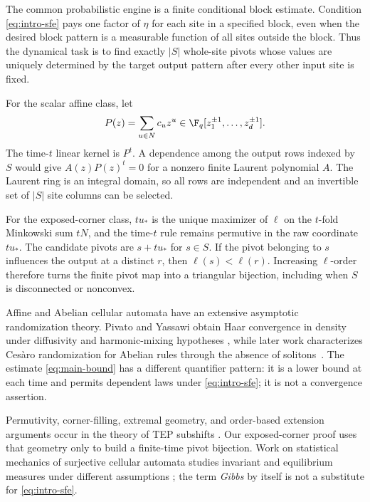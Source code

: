 The common probabilistic engine is a finite conditional block estimate.
Condition \eqref{eq:intro-sfe} pays one factor of $\eta$ for each site in a
specified block, even when the desired block pattern is a measurable
function of all sites outside the block.  Thus the dynamical task is to find
exactly $|S|$ whole-site pivots whose values are uniquely determined by the
target output pattern after every other input site is fixed.

For the scalar affine class, let
\[
  P(z)=\sum_{u\in N}c_u z^u
  \in\F_q[z_1^{\pm1},\ldots,z_d^{\pm1}].
\]
The time-$t$ linear kernel is $P^t$.  A dependence among the output rows
indexed by $S$ would give $A(z)P(z)^t=0$ for a nonzero finite Laurent
polynomial $A$.  The Laurent ring is an integral domain, so all rows are
independent and an invertible set of $|S|$ site columns can be selected.

For the exposed-corner class, $tu_*$ is the unique maximizer of $\ell$ on the
$t$-fold Minkowski sum $tN$, and the time-$t$ rule remains permutive in the
raw coordinate $tu_*$.  The candidate pivots are $s+tu_*$ for $s\in S$.
If the pivot belonging to $s$ influences the output at a distinct $r$, then
$\ell(s)<\ell(r)$.  Increasing $\ell$-order therefore turns the finite
pivot map into a triangular bijection, including when $S$ is disconnected or
nonconvex.

\FloatBarrier

\FloatBarrier

Affine and Abelian cellular automata have an extensive asymptotic
randomization theory.  Pivato and Yassawi obtain Haar convergence in density
under diffusivity and harmonic-mixing hypotheses
\cite[Theorem~12 and Proposition~14]{pivatoYassawi2002limit}
\cite[Theorem~3, Proposition~12, and Theorem~15]{pivatoYassawi2004limitII},
while later work
characterizes Ces\`aro randomization for Abelian rules through the absence of
solitons~\cite[Theorem~2]{hellouinSaloTheyssier2020randomization}.  The estimate
\eqref{eq:main-bound} has a different quantifier pattern: it is a lower bound
at each time and permits dependent laws under \eqref{eq:intro-sfe}; it is not
a convergence assertion.

Permutivity, corner-filling, extremal geometry, and order-based extension
arguments occur in the theory of TEP subshifts
\cite[Theorems~1, 19, and 20]{salo2022cutting}.  Our exposed-corner proof uses that
geometry only to build a finite-time pivot bijection.  Work on statistical
mechanics of surjective cellular automata studies invariant and equilibrium
measures under different assumptions
\cite[Corollary~21 and Theorem~41]{kariTaati2015statistical}; the
term \emph{Gibbs} by itself is not a substitute for
\eqref{eq:intro-sfe}.

